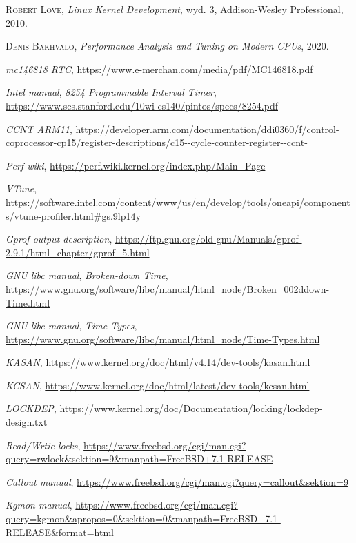 \documentclass[shortabstract]{iithesis}
\theoremstyle{definition} \newtheorem*{definition}{Definicja}
\theoremstyle{definition} \newtheorem*{example}{Przykład}
\theoremstyle{definition} \newtheorem*{remark}{Uwaga}
\begin{document}
\begin{thebibliography}{100}
\textsc{Robert Love},
\textit{Linux Kernel Development},
wyd. 3, Addison-Wesley Professional, 2010.

\textsc{Denis Bakhvalo},
\textit{Performance Analysis and Tuning on Modern CPUs},
2020.

\textit{mc146818 RTC},
\url{https://www.e-merchan.com/media/pdf/MC146818.pdf}

\textit{Intel manual},
\textit{8254 Programmable Interval Timer},
\url{https://www.scs.stanford.edu/10wi-cs140/pintos/specs/8254.pdf}

\textit{CCNT ARM11},
\url{https://developer.arm.com/documentation/ddi0360/f/control-coprocessor-cp15/register-descriptions/c15--cycle-counter-register--ccnt-}

\textit{Perf wiki},
\url{https://perf.wiki.kernel.org/index.php/Main_Page}

\textit{VTune},
\url{https://software.intel.com/content/www/us/en/develop/tools/oneapi/components/vtune-profiler.html#gs.9lp14y}

\textit{Gprof output description},
\url{https://ftp.gnu.org/old-gnu/Manuals/gprof-2.9.1/html_chapter/gprof_5.html}

\textit{GNU libc manual},
\textit{Broken-down Time},
\url{https://www.gnu.org/software/libc/manual/html_node/Broken_002ddown-Time.html}

\textit{GNU libc manual},
\textit{Time-Types},
\url{https://www.gnu.org/software/libc/manual/html_node/Time-Types.html}

\textit{KASAN},
\url{https://www.kernel.org/doc/html/v4.14/dev-tools/kasan.html}

\textit{KCSAN},
\url{https://www.kernel.org/doc/html/latest/dev-tools/kcsan.html}

\textit{LOCKDEP},
\url{https://www.kernel.org/doc/Documentation/locking/lockdep-design.txt}

\textit{Read/Wrtie locks},
\url{https://www.freebsd.org/cgi/man.cgi?query=rwlock&sektion=9&manpath=FreeBSD+7.1-RELEASE}

\textit{Callout manual},
\url{https://www.freebsd.org/cgi/man.cgi?query=callout&sektion=9}

\textit{Kgmon manual},
\url{https://www.freebsd.org/cgi/man.cgi?query=kgmon&apropos=0&sektion=0&manpath=FreeBSD+7.1-RELEASE&format=html}


\end{thebibliography}
\end{document}
